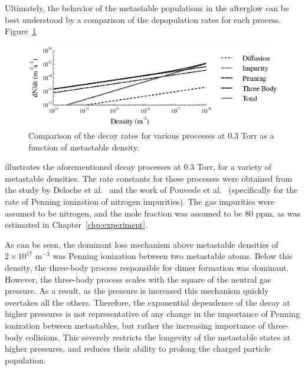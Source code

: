 Ultimately, the behavior of the metastable populations in the afterglow can be
best understood by a comparison of the depopulation rates for each process.
Figure~\ref{fig:decay}
\begin{figure}
  \centering
  \includegraphics{./chapters/metastables/figures/decay.eps}
  \caption{Comparison of the decay rates for various processes at 0.3 Torr as a
  function of metastable density.}
  \label{fig:decay}
\end{figure}
illustrates the aforementioned decay processes at 0.3 Torr, for a variety of
metastable densities. The rate constants for these processes were obtained from
the study by Deloche et al.~\cite{Deloche1976} and the work of Pouvesle et
al.~\cite{Pouvesle1988} (specifically for the rate of Penning ionization of
nitrogen impurities). The gas impurities were assumed to be nitrogen, and the
mole fraction was assumed to be 80 ppm, as was estimated in
Chapter~\ref{chp:experiment}.

As can be seen, the dominant loss mechanism above metastable densities of
$2\times10^{17}$ m$^{-3}$ was Penning ionization between two metastable atoms.
Below this density, the three-body process responsible for dimer formation was
dominant. However, the three-body process scales with the square of the neutral
gas pressure. As a result, as the pressure is increased this mechanism quickly
overtakes all the others. Therefore, the exponential dependence of the decay at
higher pressures is not representative of any change in the importance of
Penning ionization between metastables, but rather the increasing importance of
three-body collisions. This severely restricts the longevity of the metastable
states at higher pressures, and reduces their ability to prolong the charged
particle population.

